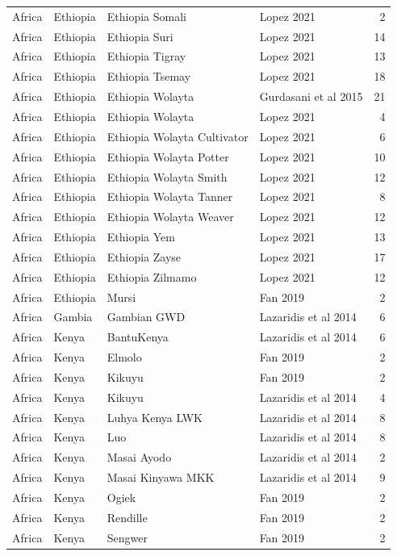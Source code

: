 \begin{longtable}[t]{lll>{\raggedright\arraybackslash}p{9em}r}
Africa & Ethiopia & Ethiopia Somali & Lopez 2021 & 2\\
Africa & Ethiopia & Ethiopia Suri & Lopez 2021 & 14\\
Africa & Ethiopia & Ethiopia Tigray & Lopez 2021 & 13\\
\addlinespace
Africa & Ethiopia & Ethiopia Tsemay & Lopez 2021 & 18\\
Africa & Ethiopia & Ethiopia Wolayta & Gurdasani et al 2015 & 21\\
Africa & Ethiopia & Ethiopia Wolayta & Lopez 2021 & 4\\
Africa & Ethiopia & Ethiopia Wolayta Cultivator & Lopez 2021 & 6\\
Africa & Ethiopia & Ethiopia Wolayta Potter & Lopez 2021 & 10\\
\addlinespace
Africa & Ethiopia & Ethiopia Wolayta Smith & Lopez 2021 & 12\\
Africa & Ethiopia & Ethiopia Wolayta Tanner & Lopez 2021 & 8\\
Africa & Ethiopia & Ethiopia Wolayta Weaver & Lopez 2021 & 12\\
Africa & Ethiopia & Ethiopia Yem & Lopez 2021 & 13\\
Africa & Ethiopia & Ethiopia Zayse & Lopez 2021 & 17\\
\addlinespace
Africa & Ethiopia & Ethiopia Zilmamo & Lopez 2021 & 12\\
Africa & Ethiopia & Mursi & Fan 2019 & 2\\
Africa & Gambia & Gambian GWD & Lazaridis et al 2014 & 6\\
Africa & Kenya & BantuKenya & Lazaridis et al 2014 & 6\\
Africa & Kenya & Elmolo & Fan 2019 & 2\\
\addlinespace
Africa & Kenya & Kikuyu & Fan 2019 & 2\\
Africa & Kenya & Kikuyu & Lazaridis et al 2014 & 4\\
Africa & Kenya & Luhya Kenya LWK & Lazaridis et al 2014 & 8\\
Africa & Kenya & Luo & Lazaridis et al 2014 & 8\\
Africa & Kenya & Masai Ayodo & Lazaridis et al 2014 & 2\\
\addlinespace
Africa & Kenya & Masai Kinyawa MKK & Lazaridis et al 2014 & 9\\
Africa & Kenya & Ogiek & Fan 2019 & 2\\
Africa & Kenya & Rendille & Fan 2019 & 2\\
Africa & Kenya & Sengwer & Fan 2019 & 2\\

\end{longtable}
